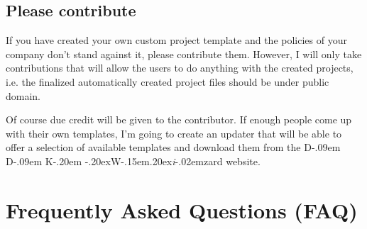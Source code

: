 \documentclass[a4paper,titlepage]{report}
\def\ddkwiz{\texorpdfstring{D\kern-.09em D\kern-.09em K\kern-.20em \raise-.20ex\hbox{W}\kern-.15em\raise.20ex\hbox{\it{i}}\kern-.02em{zard}}{DDKWizard}}
\begin{document}
\section{Please contribute}
If you have created your own custom project template and the policies of your company
don't stand against it, please contribute them. However, I will only take contributions
that will allow the users to do anything with the created projects, i.e. the finalized
automatically created project files should be under public domain.

Of course due credit will be given to the contributor. If enough people come up with
their own templates, I'm going to create an updater that will be able to offer a
selection of available templates and download them from the \ddkwiz{} website.

\chapter{Frequently Asked Questions (FAQ)}\thispagestyle{fancy}
\label{cha:faq}
\end{document}
